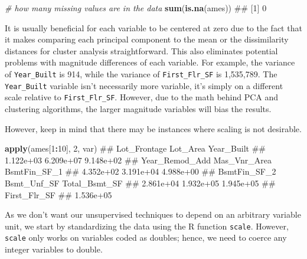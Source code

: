 \documentclass[]{book}
\newenvironment{Shaded}{\begin{snugshade}}{\end{snugshade}}
\newcommand{\CommentTok}[1]{\textcolor[rgb]{0.56,0.35,0.01}{\textit{#1}}}
\newcommand{\DecValTok}[1]{\textcolor[rgb]{0.00,0.00,0.81}{#1}}
\newcommand{\KeywordTok}[1]{\textcolor[rgb]{0.13,0.29,0.53}{\textbf{#1}}}
\newcommand{\NormalTok}[1]{#1}
\newcommand{\OperatorTok}[1]{\textcolor[rgb]{0.81,0.36,0.00}{\textbf{#1}}}
\theoremstyle{definition}
\theoremstyle{definition}
\theoremstyle{definition}
\theoremstyle{remark}
\begin{document}
\begin{Shaded}
\begin{Highlighting}[]
\CommentTok{# how many missing values are in the data}
\KeywordTok{sum}\NormalTok{(}\KeywordTok{is.na}\NormalTok{(ames))}
\NormalTok{## [1] 0}
\end{Highlighting}
\end{Shaded}

It is usually beneficial for each variable to be centered at zero due to
the fact that it makes comparing each principal component to the mean or
the dissimilarity distances for cluster analysis straightforward. This
also eliminates potential problems with magnitude differences of each
variable. For example, the variance of \texttt{Year\_Built} is 914,
while the variance of \texttt{First\_Flr\_SF} is 1,535,789. The
\texttt{Year\_Built} variable isn't necessarily more variable, it's
simply on a different scale relative to \texttt{First\_Flr\_SF}.
However, due to the math behind PCA and clustering algorithms, the
larger magnitude variables will bias the results.

\begin{note}
However, keep in mind that there may be instances where scaling is not
desirable.
\end{note}

\begin{Shaded}
\begin{Highlighting}[]
\KeywordTok{apply}\NormalTok{(ames[}\DecValTok{1}\OperatorTok{:}\DecValTok{10}\NormalTok{], }\DecValTok{2}\NormalTok{, var)}
\NormalTok{##   Lot_Frontage       Lot_Area     Year_Built }
\NormalTok{##      1.122e+03      6.209e+07      9.148e+02 }
\NormalTok{## Year_Remod_Add   Mas_Vnr_Area   BsmtFin_SF_1 }
\NormalTok{##      4.352e+02      3.191e+04      4.988e+00 }
\NormalTok{##   BsmtFin_SF_2    Bsmt_Unf_SF  Total_Bsmt_SF }
\NormalTok{##      2.861e+04      1.932e+05      1.945e+05 }
\NormalTok{##   First_Flr_SF }
\NormalTok{##      1.536e+05}
\end{Highlighting}
\end{Shaded}

As we don't want our unsupervised techniques to depend on an arbitrary
variable unit, we start by standardizing the data using the R function
\texttt{scale}. However, \texttt{scale} only works on variables coded as
doubles; hence, we need to coerce any integer variables to double.
\end{document}
